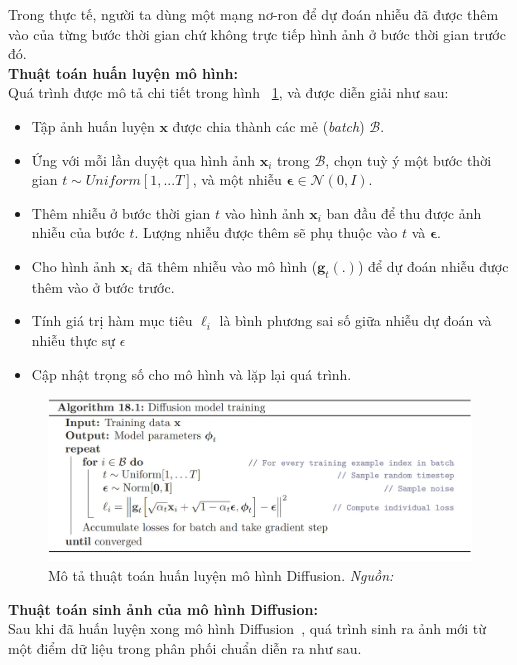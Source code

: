 Trong thực tế, người ta dùng một mạng nơ-ron để dự đoán nhiễu đã được thêm vào của từng bước thời gian chứ không trực tiếp hình ảnh ở bước thời gian trước đó.\\
%
\textbf{Thuật toán huấn luyện mô hình:}\\
%
Quá trình được mô tả chi tiết trong hình ~\ref{fig:model-diffusion-training-1}, và được diễn giải như sau:
\begin{itemize}
	\item Tập ảnh huấn luyện $\mathbf{x}$ được chia thành các mẻ (\textit{batch}) $\mathcal{B}$.
	\item Ứng với mỗi lần duyệt qua hình ảnh $\mathbf{x}_i$ trong $\mathcal{B}$, chọn tuỳ ý một bước thời gian $\mathit{t}\sim Uniform[1,...T]$, và một nhiễu $\mathbf{\epsilon} \in \mathcal{N}(0,I)$.
	\item Thêm nhiễu ở bước thời gian $\mathit{t}$ vào hình ảnh $\mathbf{x}_i$ ban đầu để thu được ảnh nhiễu của bước $\mathit{t}$. Lượng nhiễu được thêm sẽ phụ thuộc vào $\mathit{t}$ và $\mathbf{\epsilon}$.
	\item Cho hình ảnh $\mathbf{x}_i$ đã thêm nhiễu vào mô hình ($\mathbf{g}_t(.)$) để dự đoán nhiễu được thêm vào ở bước trước.
	\item Tính giá trị hàm mục tiêu $\ell_i$ là bình phương sai số giữa nhiễu dự đoán và nhiễu thực sự $\epsilon$
	\item Cập nhật trọng số cho mô hình và lặp lại quá trình.
\end{itemize}
%
\begin{figure}[h]
	\centering
	\includegraphics[width=0.9\linewidth]{Images/model-diffusion-training-1.png}
	\caption{
		Mô tả thuật toán huấn luyện mô hình Diffusion.
	\textit{Nguồn: \cite{prince2023understanding}}
	}
	\label{fig:model-diffusion-training-1}
\end{figure}
%
\textbf{Thuật toán sinh ảnh của mô hình Diffusion:}\\
%
Sau khi đã huấn luyện xong mô hình Diffusion~\cite{Ho2020DenoisingDP}, quá trình sinh ra ảnh mới từ một điểm dữ liệu trong phân phối chuẩn diễn ra như sau.
